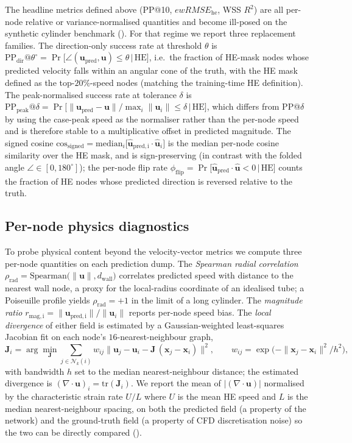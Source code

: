 \documentclass[10pt,a4paper]{article}
\makeatletter
\newcommand{\PPdir}[1]{\mathrm{PP_{dir}}@#1^\circ}
\newcommand{\cosgn}{\mathrm{cos}_\mathrm{signed}}
\newcommand{\fracflip}{\phi_\mathrm{flip}}
\newcommand{\ewRMSE}{ewRMSE_{\text{he}}}
\makeatother
\begin{document}
The headline metrics defined above (PP@10, $\ewRMSE$, WSS $R^2$) are
all per-node relative or variance-normalised quantities and become
ill-posed on the synthetic cylinder benchmark
(). For that regime we report three replacement
families. The direction-only success rate at threshold $\theta$ is
$\PPdir{\theta} = \Pr\!\big[\angle(\mathbf{u}_\mathrm{pred},\mathbf{u})
\le \theta\,\big|\,\text{HE}\big]$,
i.e.\ the fraction of HE-mask nodes whose predicted velocity falls
within an angular cone of the truth, with the HE mask defined as the
top-$20\%$-speed nodes (matching the training-time HE definition).
The peak-normalised success rate at tolerance $\delta$ is
$\mathrm{PP_{peak}}@\delta = \Pr\!\big[\|\mathbf{u}_\mathrm{pred}-\mathbf{u}\|/\max_i\|\mathbf{u}_i\|
\le \delta\,\big|\,\text{HE}\big]$,
which differs from PP@$\delta$ by using the case-peak speed as the
normaliser rather than the per-node speed and is therefore stable
to a multiplicative offset in predicted magnitude. The signed cosine
$\cosgn = \mathrm{median}_i\big[\hat{\mathbf{u}}_\mathrm{pred,i}\!\cdot\!\hat{\mathbf{u}}_i\big]$
is the median per-node cosine similarity over the HE mask, and is
sign-preserving (in contrast with the folded angle
$\angle\in[0,180^\circ]$); the per-node flip rate
$\fracflip = \Pr\!\big[\hat{\mathbf{u}}_\mathrm{pred}\!\cdot\!\hat{\mathbf{u}}<0\,\big|\,\text{HE}\big]$
counts the fraction of HE nodes whose predicted direction is
reversed relative to the truth.

\subsection*{Per-node physics diagnostics}
\label{sec:physics_diag}

To probe physical content beyond the velocity-vector metrics we
compute three per-node quantities on each prediction dump. The
\emph{Spearman radial correlation}
$\rho_\mathrm{rad} = \mathrm{Spearman}\!\big(\|\mathbf{u}\|, d_\mathrm{wall}\big)$
correlates predicted speed with distance to the nearest wall node, a
proxy for the local-radius coordinate of an idealised tube; a Poiseuille
profile yields $\rho_\mathrm{rad}=+1$ in the limit of a long cylinder.
The \emph{magnitude ratio} $r_\mathrm{mag,i} = \|\mathbf{u}_\mathrm{pred,i}\|/\|\mathbf{u}_i\|$
reports per-node speed bias. The \emph{local divergence} of either field
is estimated by a Gaussian-weighted least-squares Jacobian fit on each
node's $16$-nearest-neighbour graph,
\[
\mathbf{J}_i = \arg\min_{\mathbf{J}}\sum_{j\in\mathcal{N}_k(i)}
w_{ij}\big\|\mathbf{u}_j - \mathbf{u}_i - \mathbf{J}\,(\mathbf{x}_j-\mathbf{x}_i)\big\|^2,
\qquad w_{ij}=\exp\!\big(-\|\mathbf{x}_j-\mathbf{x}_i\|^2/h^2\big),
\]
with bandwidth $h$ set to the median nearest-neighbour distance; the
estimated divergence is $(\nabla\!\cdot\!\mathbf{u})_i = \mathrm{tr}(\mathbf{J}_i)$.
We report the mean of $|(\nabla\!\cdot\!\mathbf{u})|$ normalised by the
characteristic strain rate $U/L$ where $U$ is the mean HE speed and
$L$ is the median nearest-neighbour spacing, on both the predicted
field (a property of the network) and the ground-truth field (a
property of CFD discretisation noise) so the two can be directly
compared ().
\end{document}
